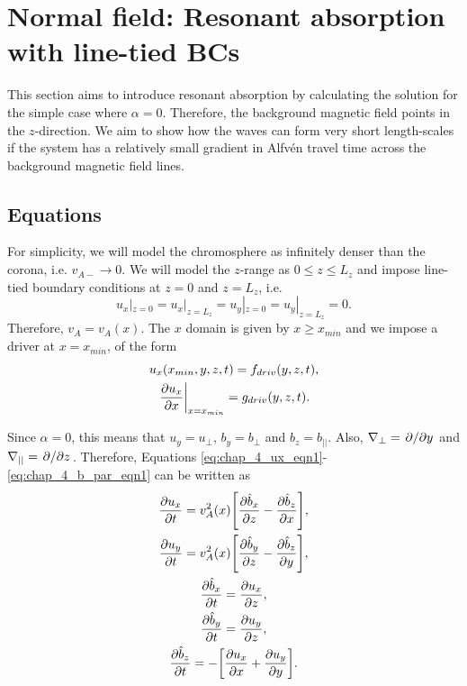 \section{Normal field: Resonant absorption with line-tied BCs}
\label{sec:normal_field_resonant_absorption_with_line_tied_bcs}

This section aims to introduce resonant absorption by calculating the solution for the simple case where $\alpha=0$. Therefore, the background magnetic field points in the $z$-direction. We aim to show how the waves can form very short length-scales if the system has a relatively small gradient in Alfv\'en travel time across the background magnetic field lines.

\subsection{Equations}

For simplicity, we will model the chromosphere as infinitely denser than the corona, i.e. $v_{A-}\rightarrow 0$. We will model the $z$-range as $0\le z\le L_z$ and impose line-tied boundary conditions at $z=0$ and $z=L_z$, i.e. 
\begin{equation}
    u_x|_{z=0}=u_x|_{z=L_z}=u_y|_{z=0}=u_y|_{z=L_z}=0.
\end{equation}
Therefore, $v_A=v_A(x)$. The $x$ domain is given by $x\ge x_{min}$ and we impose a driver at $x=x_{min}$, of the form
\begin{gather}
    \label{eq:chap_4_x_min_bcs_alpha=0}
    u_x(x_{min},y,z,t) = f_{driv}(y,z,t), \\
    \left.\pdv{u_x}{x}\right|_{x=x_{min}} = g_{driv}(y,z,t).
\end{gather}

Since $\alpha=0$, this means that $u_y = u_\perp$, $b_y = b_{\perp}$ and $b_z = b_{||}$. Also, $\nabla_\perp=\pdv*{}{y}$ and $\nabla_{||}=\pdv*{}{z}$. Therefore, Equations \eqref{eq:chap_4_ux_eqn1}-\eqref{eq:chap_4_b_par_eqn1} can be written as
\begin{gather}
    \label{eq:chap_4_ux_eqn_alpha=0}
    \pdv{u_x}{t} = v_A^2(x)\qty[\pdv{\hat{b}_x}{z} - \pdv{\hat{b}_z}{x}],\\
    \pdv{u_y}{t} = v_A^2(x)\qty[\pdv{\hat{b}_y}{z} - \pdv{\hat{b}_z}{y}],\\
    \pdv{\hat{b}_x}{t} = \pdv{u_x}{z},\\
    \pdv{\hat{b}_y}{t} = \pdv{u_y}{z},\\
    \label{eq:chap_4_bz_eqn_alpha=0}
    \pdv{\hat{b}_z}{t} = -\qty[\pdv{u_x}{x} + \pdv{u_y}{y}].
\end{gather}


